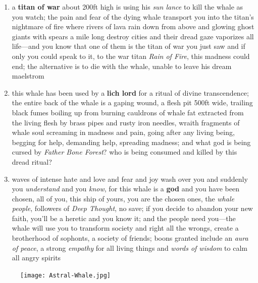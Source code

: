 \documentclass[11pt]{bxart}
\begin{document}
\begin{enumerate}
\item a \textbf{titan of war} about 200ft high is using his \textit{sun lance} to kill the whale as you watch; the pain and fear of the dying whale transport you into the titan's nightmare of fire where rivers of lava rain down from above and glowing ghost giants with spears a mile long destroy cities and their dread gaze vaporizes all life—and you know that one of them is the titan of war you just saw and if only you could speak to it, to the war titan \textit{Rain of Fire}, this madness could end; the alternative is to die with the whale, unable to leave his dream maelstrom

\item this whale has been used by a \textbf{lich lord} for a ritual of divine transcendence; the entire back of the whale is a gaping wound, a flesh pit 500ft wide, trailing black fumes boiling up from burning cauldrons of whale fat extracted from the living flesh by brass pipes and rusty iron needles, wraith fragments of whale soul screaming in madness and pain, going after any living being, begging for help, demanding help, spreading madness; and what god is being cursed by \textit{Father Bone Forest}? who is being consumed and killed by this dread ritual?

\item waves of intense hate and love and fear and joy wash over you and suddenly you \textit{understand} and you \textit{know}, for this whale is a \textbf{god} and you have been chosen, all of you, this ship of yours, you are the chosen ones, the \textit{whale people}, followers of \textit{Deep Thought}, no save; if you decide to abandon your new faith, you'll be a heretic and you know it; and the people need you—the whale will use you to transform society and right all the wrongs, create a brotherhood of sophonts, a society of friends; boons granted include an \textit{aura of peace}, a strong \textit{empathy} for all living things and \textit{words of wisdom} to calm all angry spirits
\end{enumerate}

\begin{figure}[h]
  \centering
  \texttt{[image: Astral-Whale.jpg]}
\end{figure}
\end{document}
